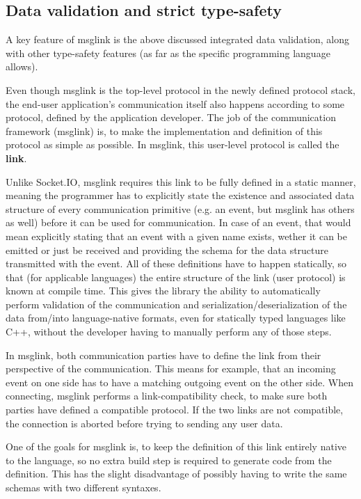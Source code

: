 \documentclass[conference]{IEEEtran}
\begin{document}
\subsection{Data validation and strict type-safety}

A key feature of msglink is the above discussed integrated data validation, along with other type-safety features (as far as the specific programming language allows).

Even though msglink is the top-level protocol in the newly defined protocol stack, the end-user application's communication itself also happens according to some protocol, defined by the application developer. The job of the communication framework (msglink) is, to make the implementation and definition of this protocol as simple as possible. In msglink, this user-level protocol is called the \textbf{link}.

Unlike Socket.IO, msglink requires this link to be fully defined in a static manner, meaning the programmer has to explicitly state the existence and associated data structure of every communication primitive (e.g. an event, but msglink has others as well) before it can be used for communication. In case of an event, that would mean explicitly stating that an event with a given name exists, wether it can be emitted or just be received and providing the schema for the data structure transmitted with the event. All of these definitions have to happen statically, so that (for applicable languages) the entire structure of the link (user protocol) is known at compile time. This gives the library the ability to automatically perform validation of the communication and serialization/deserialization of the data from/into language-native formats, even for statically typed languages like C++, without the developer having to manually perform any of those steps.

In msglink, both communication parties have to define the link from their perspective of the communication. This means for example, that an incoming event on one side has to have a matching outgoing event on the other side. When connecting, msglink performs a link-compatibility check, to make sure both parties have defined a compatible protocol. If the two links are not compatible, the connection is aborted before trying to sending any user data.

One of the goals for msglink is, to keep the definition of this link entirely native to the language, so no extra build step is required to generate code from the definition. This has the slight disadvantage of possibly having to write the same schemas with two different syntaxes. 
\end{document}

